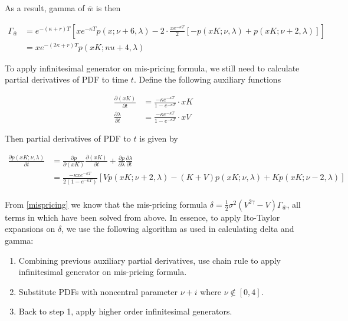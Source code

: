 \noindent As a result, gamma of $\bar{w}$ is then

\begin{equation}\label{gamma}
    \begin{aligned}
        \Gamma_{\bar{w}}&= e^{ -(\kappa+r) T} \left[x e^{-\kappa T} p(x ; \nu+6, \lambda)-2 \cdot \frac{x e^{-\kappa T}}{2} [-p(xK ; \nu, \lambda)+p(xK ; \nu+2, \lambda)]\right] \\
        &= xe^{ -(2\kappa+r) T}p(xK;nu+4,\lambda)
    \end{aligned}
\end{equation}

To apply infinitesimal generator on mis-pricing formula, we still need to calculate partial derivatives of PDF to time $t$. Define the following auxiliary functions

\begin{equation}
    \begin{aligned}
        \frac{\partial (x K)}{\partial t}&= \frac{-\kappa e^{-\kappa T}}{1 - e^{-\kappa T}} \cdot  xK\\
        \frac{\partial \lambda}{\partial t}& =\frac{-\kappa e^{-\kappa T}}{1 - e^{-\kappa T}} \cdot  xV
    \end{aligned}
\end{equation}

\noindent Then partial derivatives of PDF to $t$ is given by

\begin{equation}
    \begin{aligned}
        \frac{\partial p(xK; \nu, \lambda)}{\partial t}&= \frac{\partial p}{\partial (xK)}\frac{\partial (xK)}{\partial t} + \frac{\partial p}{\partial \lambda} \frac{\partial \lambda}{\partial t} \\
        &= \frac{-\kappa x e^{-\kappa T}}{2(1 - e^{-\kappa T})} \left[Vp(xK ; \nu+2, \lambda) - (K+V) p(xK ; \nu, \lambda) + K p(xK ; \nu-2, \lambda)\right]\\
    \end{aligned}
\end{equation}

From \eqref{mispricing} we know that the mis-pricing formula $\delta = \frac{1}{2} \sigma^2 (V^{2\gamma}-V) \Gamma_{\bar{w}}$, all terms in which have been solved from above. In essence, to apply Ito-Taylor expansions on $\delta$, we use the following algorithm as used in calculating delta and gamma:

\begin{enumerate}
    \item Combining previous auxiliary partial derivatives, use chain rule to apply infinitesimal generator on mis-pricing formula.
    \item Substitute PDFs with noncentral parameter $\nu+i$ where $\nu \notin [0,4]$.
    \item Back to step 1, apply higher order infinitesimal generators.
\end{enumerate}

